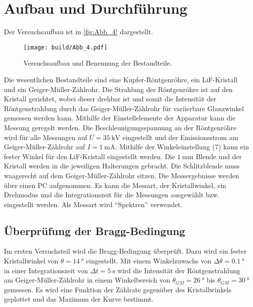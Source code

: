 \section{Aufbau und Durchführung}
\label{sec:Durchführung}

Der Versuchsaufbau ist in \autoref{fig:Abb_4} dargestellt.
\begin{figure}[H]
    \centering
    \texttt{[image: build/Abb\_4.pdf]}
    \caption{Versuchsaufbau und Benennung der Bestandteile.\cite{V602}}
    \label{fig:Abb_4}
\end{figure}

Die wesentlichen Bestandteile sind eine Kupfer-Röntgenröhre, ein LiF-Kristall und ein Geiger-Müller-Zählrohr.
Die Strahlung der Röntgenröhre ist auf den Kristall gerichtet, wobei dieser drehbar ist und somit die Intensität der 
Röntgenstrahlung durch das Geiger-Müller-Zählrohr für variierbare Glanzwinkel gemessen werden kann.
Mithilfe der Einstellelemente der Apparatur kann die Messung geregelt werden. Die Beschleunigungsspannung an der Röntgenröhre
wird für alle Messungen auf $U = \qty{35}{\kilo\volt}$ eingestellt und der Emissionsstrom am Geiger-Müller-Zählrohr auf $I = \qty{1}{\milli\ampere}$.
Mithilfe der Winkeleinstellung ($7$) kann ein fester Winkel für den LiF-Kristall eingestellt werden.
Die $\qty{1}{\milli\meter}$ Blende und der Kristall werden in die jeweiligen Halterungen gebracht.
Die Schlitzblende muss waagerecht auf dem Geiger-Müller-Zählrohr sitzen.
Die Messergebnisse werden über einen PC aufgenommen. 
Es kann die Messart, der Kristallwinkel, ein Drehmodus und die Integrationszeit für die Messungen ausgewählt bzw. eingestellt werden.
Als Messart wird  \enquote{Spektren} verwendet.

\subsection{Überprüfung der Bragg-Bedingung} %
\label{sub:Bragg_durch}

Im ersten Versuchsteil wird die Bragg-Bedingung überprüft. Dazu wird ein fester Kristallwinkel von $\theta = \qty{14}{\degree}$ eingestellt.
Mit einem Winkelzuwachs von $\Delta\theta = \qty{0.1}{\degree}$ in einer Integrationszeit
von $\Delta t = \qty{5}{\second}$ wird die Intensität der Röntgenstrahlung am Geiger-Müller-Zählrohr in
einem Winkelbereich von $\theta_{GM} = \qty{26}{\degree}$ bis $\theta_{GM} = \qty{30}{\degree}$ gemessen.
Es wird eine Funktion der Zählrate gegenüber des Kristallwinkels geplottet und das Maximum der Kurve bestimmt.

